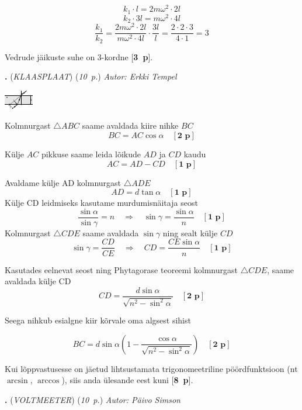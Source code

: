 \documentclass[11pt,a5paper]{article}
\newcommand{\numb}[1]{\vspace{5pt}\textbf{\large #1}}
\newcommand{\nimi}[1]{(\textsl{\small #1})}
\newcommand{\punktid}[1]{(\emph{#1~p.})}
\newcommand{\p}[1]{[\textbf{#1~p}]}
\newcounter{ylesanne}
\newcommand{\yl}[1]{\addtocounter{ylesanne}{1}\numb{\theylesanne.} \nimi{#1} \newblock{}}
\newcommand{\autor}[1]{\emph{Autor: #1}}%
\begin{document}
$$k_1 \cdot l = 2m \omega^2 \cdot 2l$$
$$k_2 \cdot 3l = m \omega^2 \cdot 4l$$
$$\frac{k_1}{k_2} = \frac{2m \omega^2 \cdot 2l}{m \omega^2 \cdot 4l} \cdot \frac{3l}{l} = \frac{2 \cdot 2 \cdot 3}{4 \cdot 1} = 3$$

Vedrude jäikuste suhe on 3-kordne \p{3}.

\yl{KLAASPLAAT}
\punktid{10} \autor{Erkki Tempel}

\begin{center}
\includegraphics[width=0.5\linewidth]{klaasplaat_lahendus.pdf}
\end{center}
  
Kolmnurgast $\triangle{ABC}$ saame avaldada kiire nihke $BC$\\
\[ BC = AC \cos{\alpha} \quad \p{2}\]

Külje $AC$ pikkuse saame leida lõikude $AD$ ja $CD$ kaudu
\[ AC = AD - CD  \quad \p{1}\]

Avaldame külje AD kolmnurgast $\triangle{ADE}$
\[ AD = d\tan{\alpha} \quad \p{1}\]
Külje CD leidmiseks kasutame murdumisnäitaja seost
\[ \frac{\sin{\alpha}}{\sin{\gamma}} = n \quad \Longrightarrow \quad \sin{\gamma} = \frac{\sin{\alpha}}{n} \quad   \p{1}\]
Kolmnurgast  $\triangle{CDE}$ saame avaldada $\sin{\gamma}$ ning sealt külje $CD$
\[ \sin{\gamma} = \frac{CD}{CE} \quad \Longrightarrow \quad  CD = \frac{CE \sin{\alpha}}{n} \quad\p{1}\]

Kasutades eelnevat seost ning Phytagorase teoreemi kolmnurgast $\triangle{CDE}$,
saame avaldada külje CD
\[  CD = \frac{d\sin{\alpha}}{\sqrt{n^2-\sin^2{\alpha}}} \quad \p{2}  \]

Seega nihkub esialgne kiir kõrvale oma algsest sihist 

\[ BC = d\sin{\alpha}\left(1 - \frac{\cos{\alpha}}{\sqrt{n^2-\sin^2{\alpha}}}\right)  \quad \p{2}  \]

Kui lõppvastusesse on jäetud lihtsustamata trigonomeetriline pöördfunktsioon (nt $\arcsin$, $\arccos$), siis anda ülesande eest kuni \p{8}.

\yl{VOLTMEETER}
\punktid{10} \autor{Päivo Simson}
\end{document}
